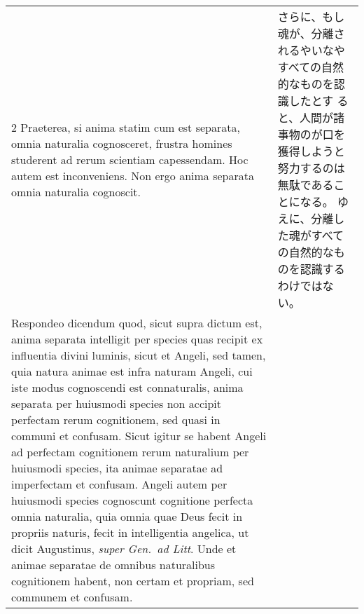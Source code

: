 \documentclass[10pt]{jsarticle} %
\begin{document}
\begin{longtable}{p{21em}p{21em}}
\\




2 {\sc Praeterea}, si anima statim cum est separata, omnia naturalia
cognosceret, frustra homines studerent ad rerum scientiam capessendam.
Hoc autem est inconveniens. Non ergo anima separata omnia naturalia
cognoscit.

&

さらに、もし魂が、分離されるやいなやすべての自然的なものを認識したとす
ると、人間が諸事物のが口を獲得しようと努力するのは無駄であることになる。
ゆえに、分離した魂がすべての自然的なものを認識するわけではない。

\\



{\sc Respondeo dicendum} quod, sicut supra dictum est, anima separata
intelligit per species quas recipit ex influentia divini luminis,
sicut et Angeli, sed tamen, quia natura animae est infra naturam
Angeli, cui iste modus cognoscendi est connaturalis, anima separata
per huiusmodi species non accipit perfectam rerum cognitionem, sed
quasi in communi et confusam. Sicut igitur se habent Angeli ad
perfectam cognitionem rerum naturalium per huiusmodi species, ita
animae separatae ad imperfectam et confusam. Angeli autem per
huiusmodi species cognoscunt cognitione perfecta omnia naturalia, quia
omnia quae Deus fecit in propriis naturis, fecit in intelligentia
angelica, ut dicit Augustinus, {\it super Gen.~ad Litt}. Unde et
animae separatae de omnibus naturalibus cognitionem habent, non certam
et propriam, sed communem et confusam.


\end{longtable}
\end{document}
